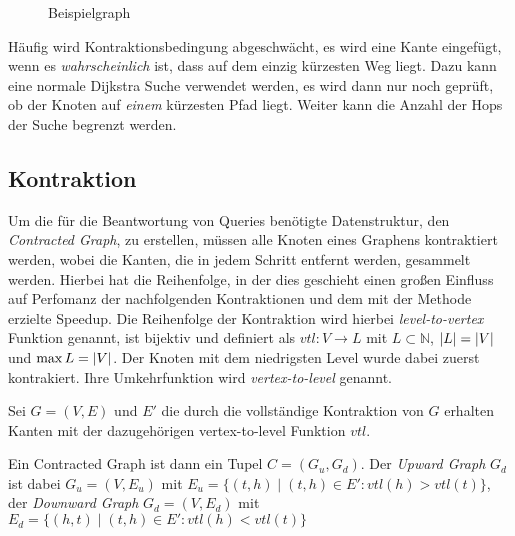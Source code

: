 \begin{figure}[ht]
    \caption{Beispielgraph}
    \label{graphs:fig:example_contraction}
\end{figure}

Häufig wird Kontraktionsbedingung abgeschwächt, es wird eine Kante eingefügt, wenn es \emph{wahrscheinlich} ist, dass auf dem einzig kürzesten Weg liegt.
Dazu kann eine normale Dijkstra Suche verwendet werden, es wird dann nur noch geprüft, ob der Knoten auf \emph{einem} kürzesten Pfad liegt.
Weiter kann die Anzahl der Hops der Suche begrenzt werden.

\subsection{Kontraktion}

Um die für die Beantwortung von Queries benötigte Datenstruktur, den \emph{Contracted Graph}, zu erstellen, müssen alle Knoten eines Graphens kontraktiert werden, wobei die Kanten, die in jedem Schritt entfernt werden, gesammelt werden.
Hierbei hat die Reihenfolge, in der dies geschieht einen großen Einfluss auf Perfomanz der nachfolgenden Kontraktionen und dem mit der Methode erzielte Speedup.
Die Reihenfolge der Kontraktion wird hierbei \emph{level-to-vertex} Funktion genannt, ist bijektiv und definiert als ${vtl} \colon V \to L$ mit $L \subset \mathbb{N}$, $\abs{L} = \abs{V}$ und $\max{L} = \abs{V}$.
Der Knoten mit dem niedrigsten Level wurde dabei zuerst kontrakiert.
Ihre Umkehrfunktion wird \emph{vertex-to-level} genannt.

\begin{definition}
    Sei $G = (V, E)$ und $E'$ die durch die vollständige Kontraktion von $G$ erhalten Kanten mit der dazugehörigen vertex-to-level Funktion ${vtl}$.

    Ein Contracted Graph ist dann ein Tupel $C = (G_u, G_d)$. Der \emph{Upward Graph} $G_d$ ist dabei $G_u = (V, E_u)$ mit $E_u = \{ (t, h) \mid (t, h) \in E' \colon  {vtl}(h) > {vtl}(t) \}$, der \emph{Downward Graph} $G_d = (V, E_d)$ mit $E_d = \{ (h, t) \mid (t, h) \in E' \colon  {vtl}(h) < {vtl}(t) \}$
\end{definition}


